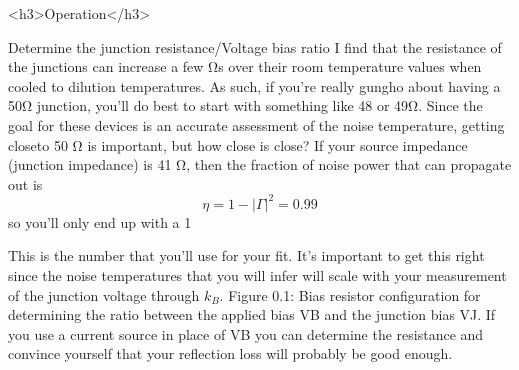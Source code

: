 \documentclass[11pt]{article}
\begin{document}
<h3>Operation</h3>



Determine the junction resistance/Voltage bias ratio I ﬁnd that the resistance of the junctions can increase a few Ωs over their room temperature values when cooled to dilution temperatures. As such, if you’re really gungho about having a 50Ω junction, you’ll do best to start with something like 48 or 49Ω. Since the goal for these
devices is an accurate assessment of the noise temperature, getting closeto 50 Ω is important, but how close is close? If your source impedance (junction impedance) is 41 Ω, then the fraction of noise power that can propagate out is 
$$
\eta= 1−|\Gamma|^2 = 0.99 
$$
so you’ll only end up with a 1%




This is the number that you’ll use for your ﬁt. It’s important to get this right since the noise temperatures that you will infer will scale with your measurement of the junction voltage through $k_B$.
Figure 0.1: Bias resistor conﬁguration for determining the ratio between the applied bias VB and the junction bias VJ. If you use a current source in place of VB you can determine the resistance and convince yourself that your reﬂection loss will probably be good enough.
\end{document}

